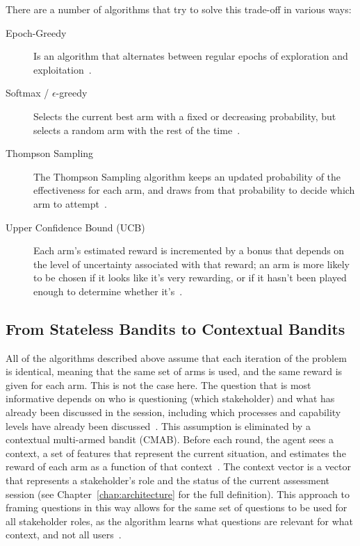 \documentclass[a4paper, 12pt, oneside, openany, BCOR1cm,toc=chapterentrywithdots]{scrbook}
\begin{document}
There are a number of algorithms that try to solve this trade-off in various ways:

\begin{description}
  \item[Epoch-Greedy] Is an algorithm that alternates between regular epochs of exploration and
  exploitation~\cite{langford2007epochgreedy}.
  \item[Softmax / $\epsilon$-greedy] Selects the current best arm with a fixed or decreasing
  probability, but selects a random arm with the rest of the
  time~\cite{tokic2011valuedifference}.
  \item[Thompson Sampling] The Thompson Sampling algorithm keeps an updated probability of the
  effectiveness for each arm, and draws from that probability to decide which arm to
  attempt~\cite{agrawal2013thompson}.
  \item[Upper Confidence Bound (UCB)] Each arm's estimated reward is incremented by a bonus that
  depends on the level of uncertainty associated with that reward; an arm is more likely to be
  chosen if it looks like it's very rewarding, or if it hasn't been played enough to determine
  whether it's~\cite{auer2002confidence}.
\end{description}

\subsection{From Stateless Bandits to Contextual Bandits}

All of the algorithms described above assume that each iteration of the problem is identical,
meaning that the same set of arms is used, and the same reward is given for each arm. This is
not the case here. The question that is most informative depends on who is questioning (which
stakeholder) and what has already been discussed in the session, including which processes and
capability levels have already been discussed~\cite{datsogiannis2024early}. This assumption is
eliminated by a contextual multi-armed bandit (CMAB). Before each round, the agent sees a
context, a set of features that represent the current situation, and estimates the reward of
each arm as a function of that context~\cite{li2010contextual}. The context vector is a vector
that represents a stakeholder's role and the status of the current assessment session (see
Chapter~\ref{chap:architecture} for the full definition). This approach to framing questions in
this way allows for the same set of questions to be used for all stakeholder roles, as the
algorithm learns what questions are relevant for what context, and not all
users~\cite{gutowski2018contextenhancement}.
\end{document}
